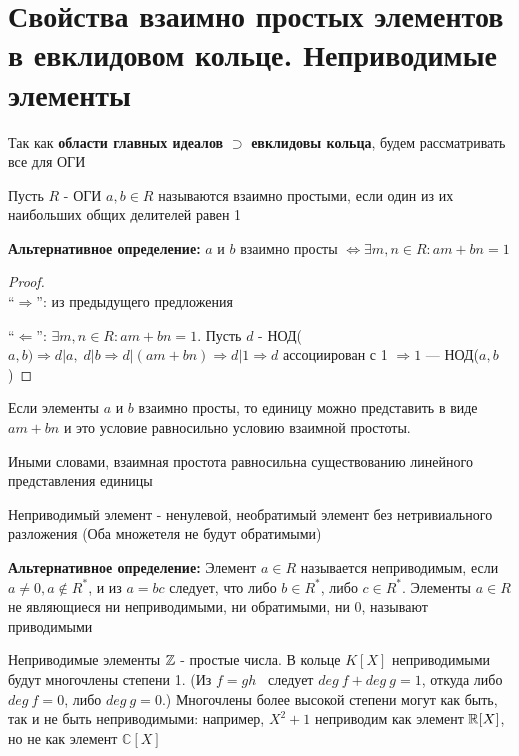 \section{Свойства взаимно простых элементов в евклидовом кольце. Неприводимые элементы}
\begin{normalsize}
    Так как \textbf{области главных идеалов} $\supset$ \textbf{евклидовы кольца}, будем рассматривать все для ОГИ \\
    \begin{conj}
        Пусть $R$ - ОГИ 
        $a, b \in R$ называются взаимно простыми, если один из их наибольших общих делителей равен 1
    \end{conj}
    \textbf{Альтернативное определение:} $a$ и $b$ взаимно просты $\Longleftrightarrow \exists m,n \in R: am + bn = 1$ 
    \begin{proof} \quad \\
        ``$\Longrightarrow$'': из предыдущего предложения

        ``$\Longleftarrow$'': $\exists m,n \in R: am + bn = 1$. Пусть $d$ - НОД($a, b) \Longrightarrow d|a, \; d|b \Longrightarrow d|(am + bn) 
        \Longrightarrow d|1 \Longrightarrow d$ ассоциирован с 1 $\Longrightarrow 1$ --- НОД($a, b$) 
    \end{proof}
    Если элементы $a$ и $b$ взаимно просты, то единицу можно представить в виде $am + bn$ и это условие равносильно условию взаимной простоты.

    Иными словами, взаимная простота равносильна существованию линейного представления единицы
    \begin{conj}
        Неприводимый элемент - ненулевой, необратимый элемент без нетривиального разложения (Оба множетеля не будут обратимыми)
    \end{conj}
    \textbf{Альтернативное определение:} Элемент $a \in R$ называется неприводимым, если $a \neq 0, a \notin R^*$, и из 
    $a = bc$ следует, что либо $b \in R^*$, либо $c \in R^*$. Элементы $a \in R$ не являющиеся ни неприводимыми, ни обратимыми, ни 0, называют приводимыми
    
    \qquad Неприводимые элементы $\mathbb{Z}$ - простые числа. В кольце $K[X]$ неприводимыми будут многочлены степени 1. (Из $f = gh$  следует $deg \ f + deg \ g = 1$, откуда либо
    $deg \ f = 0$, либо $deg \ g = 0$.) Многочлены более высокой степени могут как быть, так и не быть неприводимыми: например, $X^2 + 1$ 
    неприводим как элемент $\mathbb{R}[X]$, но не как элемент $\mathbb{C}[X]$


\end{normalsize}
